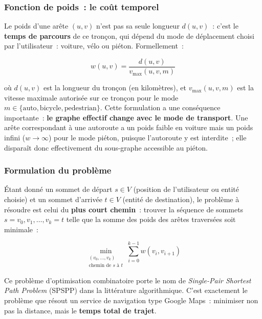\documentclass[12pt, a4paper]{report}
\begin{document}
\subsubsection{Fonction de poids~: le coût temporel}

Le poids d'une arête $(u, v)$ n'est pas sa seule longueur $d(u, v)$~: c'est le
\textbf{temps de parcours} de ce tronçon, qui dépend du mode de déplacement
choisi par l'utilisateur~: voiture, vélo ou piéton. Formellement~:

\begin{equation}
  w(u, v) = \frac{d(u, v)}{v_{\text{max}}(u, v, m)}
  \label{eq:poids-arete}
\end{equation}

où $d(u, v)$ est la longueur du tronçon (en kilomètres), et
$v_{\text{max}}(u, v, m)$ est la vitesse maximale autorisée sur ce tronçon
pour le mode $m \in \{\text{auto}, \text{bicycle}, \text{pedestrian}\}$. Cette
formulation a une conséquence importante~: \textbf{le graphe effectif change
avec le mode de transport}. Une arête correspondant à une autoroute a un
poids faible en voiture mais un poids infini ($w \rightarrow \infty$) pour le
mode piéton, puisque l'autoroute y est interdite~; elle disparaît donc
effectivement du sous-graphe accessible au piéton.

\subsubsection{Formulation du problème}

Étant donné un sommet de départ $s \in V$ (position de l'utilisateur ou
entité choisie) et un sommet d'arrivée $t \in V$ (entité de destination), le
problème à résoudre est celui du \textbf{plus court chemin}~: trouver la
séquence de sommets $s = v_0, v_1, \dots, v_k = t$ telle que la somme des
poids des arêtes traversées soit minimale~:

\begin{equation}
  \min_{\substack{(v_0, \dots, v_k) \\ \text{chemin de } s \text{ à } t}}
  \sum_{i=0}^{k-1} w(v_i, v_{i+1})
  \label{eq:plus-court-chemin}
\end{equation}

Ce problème d'optimisation combinatoire porte le nom de \textit{Single-Pair
Shortest Path Problem} (SPSPP) dans la littérature algorithmique. C'est
exactement le problème que résout un service de navigation type Google
Maps~: minimiser non pas la distance, mais le \textbf{temps total de
trajet}.
\end{document}

